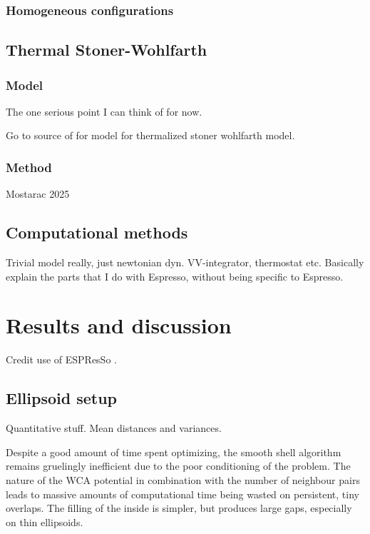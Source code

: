 \documentclass[12pt, DIV=12]{scrartcl}
\begin{document}
\subsubsection{Homogeneous configurations}

\subsection{Thermal Stoner-Wohlfarth}
\subsubsection{Model}
The one serious point I can think of for now.

Go to source of \cite{Mostarac2025} for model for thermalized stoner wohlfarth model.

\subsubsection{Method}
Mostarac 2025 \cite{Mostarac2025}

\subsection{Computational methods}
Trivial model really, just newtonian dyn.
VV-integrator, thermostat etc.
Basically explain the parts that I do with Espresso, without being specific to Espresso.


\section{Results and discussion}

Credit use of ESPResSo \cite{Weeber2024} \cite{Weik2019} \cite{Grad2026}.

\subsection{Ellipsoid setup}

Quantitative stuff. Mean distances and variances.

Despite a good amount of time spent optimizing, the smooth shell algorithm remains gruelingly inefficient due to the poor conditioning of the problem. The nature of the WCA potential in combination with the number of neighbour pairs leads to massive amounts of computational time being wasted on persistent, tiny overlaps.
The filling of the inside is simpler, but produces large gaps, especially on thin ellipsoids.
\end{document}
